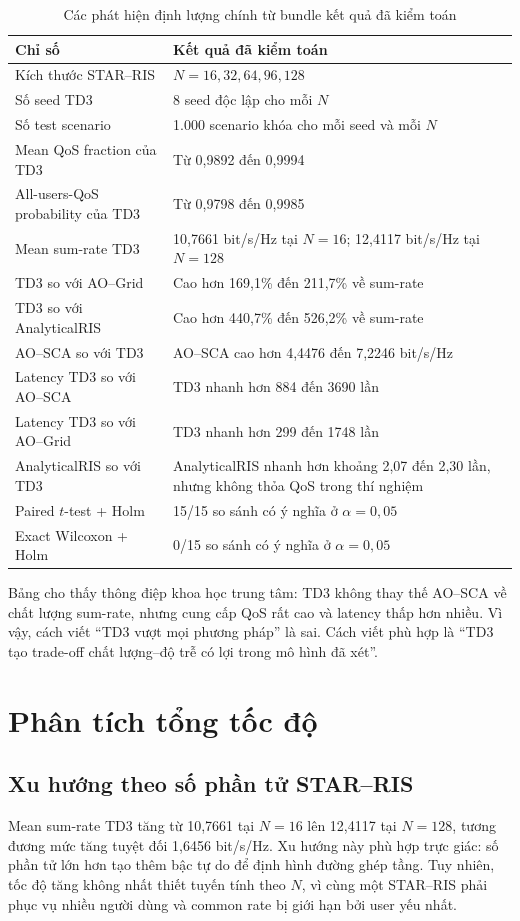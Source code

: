 \begin{table}[H]
\caption{Các phát hiện định lượng chính từ bundle kết quả đã kiểm toán}
\label{tab:audited-findings}
\begin{tabularx}{\textwidth}{p{5.2cm}Y}
\toprule
\textbf{Chỉ số} & \textbf{Kết quả đã kiểm toán}\\
\midrule
Kích thước STAR--RIS & $N=16,32,64,96,128$\\
Số seed TD3 & 8 seed độc lập cho mỗi $N$\\
Số test scenario & 1.000 scenario khóa cho mỗi seed và mỗi $N$\\
Mean QoS fraction của TD3 & Từ 0,9892 đến 0,9994\\
All-users-QoS probability của TD3 & Từ 0,9798 đến 0,9985\\
Mean sum-rate TD3 & 10,7661 bit/s/Hz tại $N=16$; 12,4117 bit/s/Hz tại $N=128$\\
TD3 so với AO--Grid & Cao hơn 169,1\% đến 211,7\% về sum-rate\\
TD3 so với AnalyticalRIS & Cao hơn 440,7\% đến 526,2\% về sum-rate\\
AO--SCA so với TD3 & AO--SCA cao hơn 4,4476 đến 7,2246 bit/s/Hz\\
Latency TD3 so với AO--SCA & TD3 nhanh hơn 884 đến 3690 lần\\
Latency TD3 so với AO--Grid & TD3 nhanh hơn 299 đến 1748 lần\\
AnalyticalRIS so với TD3 & AnalyticalRIS nhanh hơn khoảng 2,07 đến 2,30 lần, nhưng không thỏa QoS trong thí nghiệm\\
Paired $t$-test + Holm & 15/15 so sánh có ý nghĩa ở $\alpha=0,05$\\
Exact Wilcoxon + Holm & 0/15 so sánh có ý nghĩa ở $\alpha=0,05$\\
\bottomrule
\end{tabularx}
\end{table}

Bảng cho thấy thông điệp khoa học trung tâm: TD3 không thay thế AO--SCA về chất lượng sum-rate, nhưng cung cấp QoS rất cao và latency thấp hơn nhiều. Vì vậy, cách viết ``TD3 vượt mọi phương pháp'' là sai. Cách viết phù hợp là ``TD3 tạo trade-off chất lượng--độ trễ có lợi trong mô hình đã xét''.

\section{Phân tích tổng tốc độ}
\subsection{Xu hướng theo số phần tử STAR--RIS}
Mean sum-rate TD3 tăng từ 10,7661 tại $N=16$ lên 12,4117 tại $N=128$, tương đương mức tăng tuyệt đối 1,6456 bit/s/Hz. Xu hướng này phù hợp trực giác: số phần tử lớn hơn tạo thêm bậc tự do để định hình đường ghép tầng. Tuy nhiên, tốc độ tăng không nhất thiết tuyến tính theo $N$, vì cùng một STAR--RIS phải phục vụ nhiều người dùng và common rate bị giới hạn bởi user yếu nhất.

